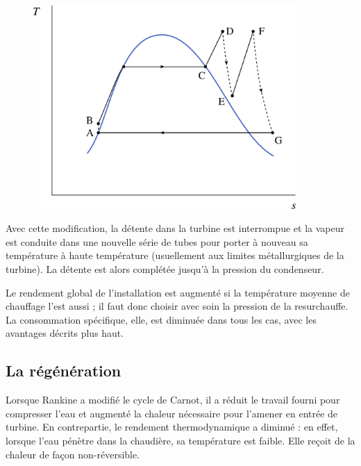 		\begin{figure}
			\begin{center}
				\includegraphics[width=10cm]{images/ts_lv_rankine_surchauffe_resurchauffe.png}
			\end{center}
			\label{fig_ts_lv_surchauffe_resurchauffe}
		\end{figure}

		Avec cette modification, la détente dans la turbine est interrompue et la vapeur est conduite dans une nouvelle série de tubes pour porter à nouveau sa température à haute température (usuellement aux limites métallurgiques de la turbine). La détente est alors complétée jusqu’à la pression du condenseur.

		Le rendement global de l’installation est augmenté si la température moyenne de chauffage l’est aussi ; il faut donc choisir avec soin la pression de la resurchauffe. La consommation spécifique, elle, est diminuée dans tous les cas, avec les avantages décrits plus haut.



	\subsection{La régénération}
	\label{ch_regeneration}

		Lorsque Rankine a modifié le cycle de Carnot, il a réduit le travail fourni pour compresser l’eau et augmenté la chaleur nécessaire pour l’amener en entrée de turbine. En contrepartie, le rendement thermodynamique a diminué : en effet, lorsque l’eau pénètre dans la chaudière, sa température est faible. Elle reçoit de la chaleur de façon non-réversible.

